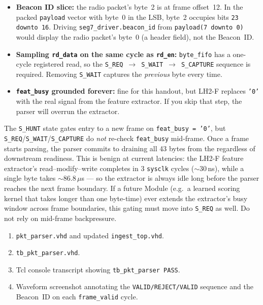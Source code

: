 \documentclass[11pt,letterpaper]{article}
\begin{document}
\begin{tcolorbox}[warning={Common Pitfalls}]
	\begin{itemize}[leftmargin=1.2em]
		\item \textbf{Beacon ID slice:} the radio packet's byte~2 is at frame offset~12. In the packed \texttt{payload} vector with byte~0 in the \mbox{LSB}, byte~2 occupies bits \texttt{23 downto 16}. Driving \texttt{seg7\_driver.beacon\_id} from \texttt{payload(7 downto 0)} would display the radio packet's byte~0 (a header field), not the Beacon~ID.
		\item \textbf{Sampling \texttt{rd\_data} on the same cycle as \texttt{rd\_en}:} \texttt{byte\_fifo} has a one-cycle registered read, so the \texttt{S\_REQ}~$\to$~\texttt{S\_WAIT}~$\to$~\texttt{S\_CAPTURE} sequence is required. Removing \texttt{S\_WAIT} captures the \emph{previous} byte every time.
		\item \textbf{\texttt{feat\_busy} grounded forever:} fine for this handout, but LH2-F replaces \texttt{'0'} with the real signal from the feature extractor. If you skip that step, the parser will overrun the extractor.
	\end{itemize}
\end{tcolorbox}

\begin{tcolorbox}[infobox={Known limitation: \texttt{feat\_busy} is only checked at frame boundaries}]
The \texttt{S\_HUNT} state gates entry to a new frame on \texttt{feat\_busy = '0'}, but \texttt{S\_REQ}/\texttt{S\_WAIT}/\texttt{S\_CAPTURE} do \emph{not} re-check \texttt{feat\_busy} mid-frame. Once a frame starts parsing, the parser commits to draining all 43 bytes from the \FIFO{} regardless of downstream readiness. This is benign at current latencies: the LH2-F feature extractor's read--modify--write completes in 3 \texttt{sysclk} cycles ($\sim$30\,ns), while a single \UART{} byte takes $\sim$86.8\,$\mu$s --- so the extractor is always idle long before the parser reaches the next frame boundary. If a future Module (e.g.\ a learned scoring kernel that takes longer than one byte-time) ever extends the extractor's busy window across frame boundaries, this gating must move into \texttt{S\_REQ} as well. Do not rely on mid-frame backpressure.
\end{tcolorbox}

\begin{tcolorbox}[deliverable={Lab Handout 2-D Deliverable}]
	\begin{enumerate}[leftmargin=1.2em]
		\item \texttt{pkt\_parser.vhd} and updated \texttt{ingest\_top.vhd}.
		\item \texttt{tb\_pkt\_parser.vhd}.
		\item Tcl console transcript showing \texttt{tb\_pkt\_parser PASS}.
		\item Waveform screenshot annotating the \texttt{VALID/REJECT/VALID} sequence and the Beacon~ID on each \texttt{frame\_valid} cycle.
	\end{enumerate}
\end{tcolorbox}

\printhandoutglossary
\end{document}
